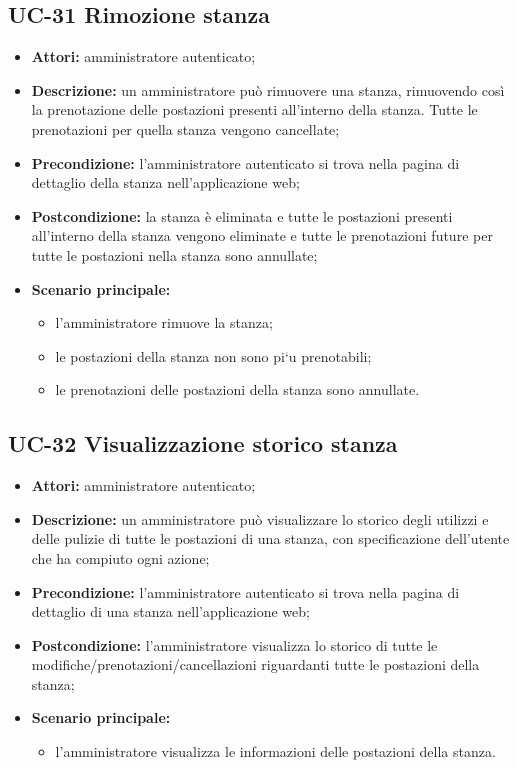 \subsection{UC-31 Rimozione stanza}
\begin{itemize}
    \item \textbf{Attori:} amministratore autenticato;
    \item \textbf{Descrizione:} un amministratore pu\`{o} rimuovere una stanza, rimuovendo cos\`{i} la prenotazione delle postazioni presenti all'interno della stanza. Tutte le prenotazioni per quella stanza vengono cancellate;
    \item \textbf{Precondizione:} l'amministratore autenticato si trova nella pagina di dettaglio della stanza nell'applicazione web;
    \item \textbf{Postcondizione:} la stanza \`{e} eliminata e tutte le postazioni presenti all'interno della stanza vengono eliminate e tutte le prenotazioni future per tutte le postazioni nella stanza sono annullate;
    \item \textbf{Scenario principale:}
    \begin{itemize}
        \item l'amministratore rimuove la stanza;
        \item le postazioni della stanza non sono pi`{u} prenotabili;
        \item le prenotazioni delle postazioni della stanza sono annullate.
    \end{itemize}
\end{itemize}



\subsection{UC-32 Visualizzazione storico stanza}
\begin{itemize}
    \item \textbf{Attori:} amministratore autenticato;
    \item \textbf{Descrizione:} un amministratore pu\`{o} visualizzare lo storico degli utilizzi e delle pulizie di tutte le postazioni di una stanza, con specificazione dell'utente che ha compiuto ogni azione;
    \item \textbf{Precondizione:} l'amministratore autenticato si trova nella pagina di dettaglio di una stanza nell'applicazione web;
    \item \textbf{Postcondizione:} l'amministratore visualizza lo storico di tutte le modifiche/prenotazioni/cancellazioni riguardanti tutte le postazioni della stanza;
    \item \textbf{Scenario principale:}
    \begin{itemize}
        \item l'amministratore visualizza le informazioni delle postazioni della stanza.
    \end{itemize}
\end{itemize}



